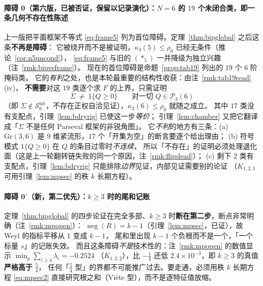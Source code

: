 \documentclass[UTF8,11pt]{ctexart}
\theoremstyle{definition}
\begin{document}
\paragraph{障碍 0（第六版，\textbf{已被否证}，保留以记录演化）：$N=6$ 的 $19$ 个未闭合类，即一条几何不存在性陈述}
上一版把平面框架不等式 \eqref{eq:frame5} 列为首位障碍。定理~\ref{thm:bipglobal} 之后这条\textbf{不再是障碍}：
它被绕开而不是被证明，$\kappa_3(5)\le\rho_0$ 已经无条件（推论~\ref{cor:n5uncond}），
\eqref{eq:frame5} 与旧的 $(\ast_5)$ 一并降级为独立兴趣（注~\ref{rmk:bipvsframe}）。
现在的首位障碍是命题~\ref{prop:tab19} 列出的 $19$ 个 $6$ 阶掩码类。
它的\emph{有利}之处，也是本轮最重要的结构性收获：由注~\ref{rmk:tab19read}(iv)，
\textbf{不需要}对这 $19$ 类逐个求 $F$ 的上界，只需证明
\begin{equation*}
\Sigma\ \ne\ 1\{Q\ge0\}\qquad\text{对一切 }Q\in\mathcal P_3(6)
\end{equation*}
（即 $\Sigma\notin\mathcal S_6^{\mathrm{int}}$，不存在正权自洽见证），$\kappa_3(6)\le\rho_0$ 就随之成立。
其中 $17$ 类没有支配点，引理~\ref{lem:bdryrig} 已使这一步\emph{等价}；
引理~\ref{lem:chamber} 又把它翻译成「$\Sigma$ 不是任何 Parseval 框架的非锐角图」。
它\emph{不利}的地方有三条：(a) $\mathrm{Gr}(3,6)$ 是 $9$ 维紧流形，$17$ 个「开集为空」的断言要逐个给出理由；
(b) 符号模式 $1\{Q\ge0\}$ 在 $Q$ 的条目过零时\emph{不连续}，
所以「不存在」的证明必须处理退化面（这是上一轮翻转链失败的同一个原因，注~\ref{rmk:flipdead}）；
(c) 剩下 $2$ 类有支配点，引理~\ref{lem:bdryrig} 只能排除\emph{边界}见证，内部见证需要别的论证
（$K_{1,2,3}$ 可用引理~\ref{lem:mpsec} 的秩 $k$ 长期方程）。

\paragraph{障碍 0$'$（新，第二优先）：$k\ge3$ 时的尾和记账}
定理~\ref{thm:bipglobal} 的四步论证在完全多部、$k\ge3$ 时\textbf{断在第二步}，断点非常明确（注~\ref{rmk:mpopen}）：
$\operatorname{neg}(R)=k-1$（引理~\ref{lem:mpsec}，已证），故 Weyl 的指标平移从 $1$ 变成 $k-1$，
尾和里出现 $k-1$ 个负根而不是一个，「一个标量 $s$」的记账失效。
而且这条障碍\emph{不是}技术性的：注~\ref{rmk:mpopen} 的数值显示 $\min_p\sum_{i\ge4}\lambda_i=-0.2524$
（$K_{1,2,2}$），比 $-\frac14$ 还低 $2.4\times10^{-3}$，即 $k\ge3$ 的真值\textbf{严格高于} $\frac54$，
任何「$\frac54$ 型」的界都不可能推广过去。要走通，必须用秩 $k$ 长期方程 \eqref{eq:mpsec2}
直接研究根之和（Viète 型），而不是逐特征值放缩。
\end{document}
